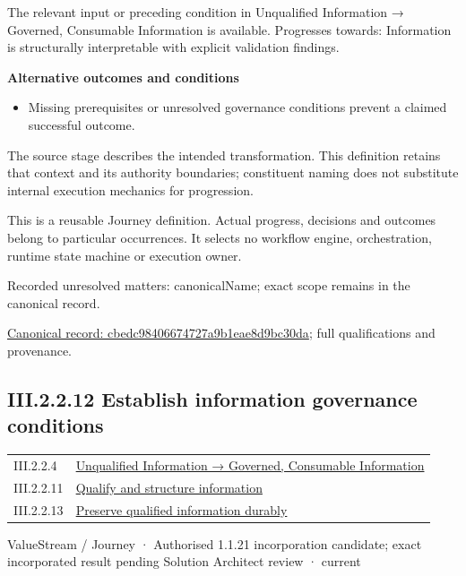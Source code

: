 The relevant input or preceding condition in Unqualified Information → Governed, Consumable Information is available. Progresses towards: Information is structurally interpretable with explicit validation findings.



\par\medskip\textbf{Alternative outcomes and conditions}\par


\begin{itemize}


\item Missing prerequisites or unresolved governance conditions prevent a claimed successful outcome.

\end{itemize}


The source stage describes the intended transformation. This definition retains that context and its authority boundaries; constituent naming does not substitute internal execution mechanics for progression.



This is a reusable Journey definition. Actual progress, decisions and outcomes belong to particular occurrences. It selects no workflow engine, orchestration, runtime state machine or execution owner.


{\small Recorded unresolved matters: canonicalName; exact scope remains in the canonical record.}\par
{\footnotesize \href{../../../../../../../continuum/strategy/value-stream/cbedc98406674727a9b1eae8d9bc30da.md}{Canonical record: cbedc98406674727a9b1eae8d9bc30da}; full qualifications and provenance.}\par
\subsection*{III.2.2.12 Establish information governance conditions}
\label{navigation:III.2.2.12}

\begin{longtable}{p{.22\linewidth}p{.73\linewidth}}
III.2.2.4 & \hyperref[element:02e036f18bab400bac261007e39457ee]{Unqualified Information → Governed, Consumable Information} \\
III.2.2.11 & \hyperref[element:cbedc98406674727a9b1eae8d9bc30da]{Qualify and structure information} \\
III.2.2.13 & \hyperref[element:e07ef0bcd9444af3a22ab45bbb3afc38]{Preserve qualified information durably} \\
\end{longtable}
\label{element:ae90f7118fe245659f4524fc8991614d}
{\small ValueStream / Journey · Authorised 1.1.21 incorporation candidate; exact incorporated result pending Solution Architect review · current}\par

